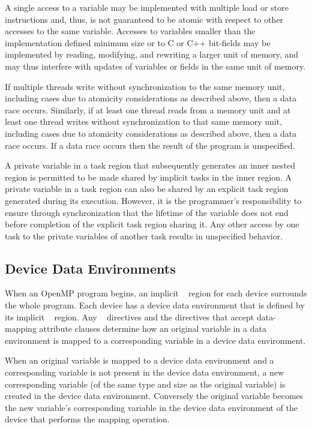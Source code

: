 A single access to a variable may be implemented with multiple load or store
instructions and, thus, is not guaranteed to be atomic with respect to other 
accesses to the same variable. Accesses to variables smaller than the 
implementation defined minimum size or to C or C++ bit-fields may be 
implemented by reading, modifying, and rewriting a larger unit of memory, 
and may thus interfere with updates of variables or fields in the same 
unit of memory.

If multiple threads write without synchronization to the same memory 
unit, including cases due to atomicity considerations as described above, 
then a data race occurs. Similarly, if at least one thread reads from a 
memory unit and at least one thread writes without synchronization to 
that same memory unit, including cases due to atomicity considerations 
as described above, then a data race occurs. If a data race occurs then the
result of the program is unspecified.

A private variable in a task region that subsequently generates an inner 
nested  region is permitted to be made shared by implicit 
tasks in the inner  region. A private variable in a task 
region can also be shared by an explicit task region generated during its 
execution. However, it is the programmer's responsibility to ensure through
synchronization that the lifetime of the variable does not end before 
completion of the explicit task region sharing it. Any other access by 
one task to the private variables of another task results in unspecified 
behavior.



\subsection{Device Data Environments}
\label{subsec:Device Data Environments}
When an OpenMP program begins, an implicit ~ 
region for each device surrounds the whole program. Each device has 
a device data environment that is defined by its implicit 
~ region. Any ~ 
directives and the directives that accept data-mapping attribute 
clauses determine how an original variable in a data environment 
is mapped to a corresponding variable in a device data environment.

When an original variable is mapped to a device data environment 
and a corresponding variable is not present in the device data 
environment, a new corresponding variable (of the same type and 
size as the original variable) is created in the device data 
environment. Conversely the original variable becomes the new 
variable's corresponding variable in the device data environment 
of the device that performs the mapping operation.


